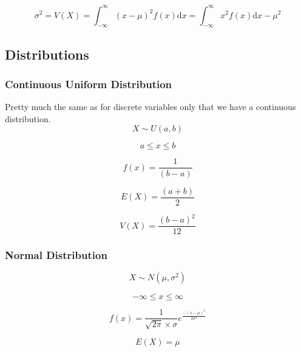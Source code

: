\documentclass[a4paper, 10pt]{article}
\begin{document}
	\begin{equation*}
	\sigma ^2 = V(X) = \int_{-\infty}^{\infty}(x-\mu)^2f(x)\mathrm{d} x = \int_{-\infty}^{\infty}x^2f(x)\mathrm{d} x-\mu ^2
	\end{equation*}

	\newpage
	\subsection{Distributions}

	\subsubsection{Continuous Uniform Distribution}

	Pretty much the same as for discrete variables only that we have a continuous distribution.
	\begin{equation*}
		X\sim U(a,b)
	\end{equation*}

	\begin{equation*}
		a\leq x\leq b
	\end{equation*}

	\begin{equation*}
		f(x)=\frac{1}{(b-a)}
	\end{equation*}

	\begin{equation*}
		E(X)=\frac{(a+b)}{2}
	\end{equation*}

	\begin{equation*}
		V(X)=\frac{(b-a)^2}{12}
	\end{equation*}

	\subsubsection{Normal Distribution}

	\begin{equation*}
		X\sim N(\mu,\sigma ^2)
	\end{equation*}

	\begin{equation*}
		-\infty \leq x\leq \infty
	\end{equation*}

	\begin{equation*}
		f(x)=\frac{1}{\sqrt{2\pi}\times \sigma}e^{\frac{-(x-\mu)^2}{2\sigma ^2}}
	\end{equation*}

	\begin{equation*}
		E(X)=\mu
	\end{equation*}
\end{document}
